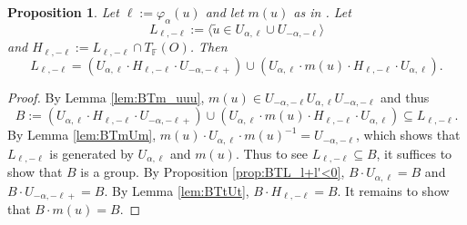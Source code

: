 \documentclass[12pt]{amsart}
\newcommand{\F}{\mathbb{F} }
\numberwithin{equation}{section}
\newtheorem{proposition}[theorem]{Proposition}
\theoremstyle{remark} %
\begin{document}
		\begin{proposition}\label{prop:BTL_l+l'=0} %
			Let 
			$\ell := \varphi_\alpha(u)$ and let $m(u)$ as in \cite[Lemma \ref{I-lem:Jacobson_Morozov_m}]{AppAGRCF}. Let 
			$$
			L_{\ell,- \ell} := \langle \tilde{u} \in U_{\alpha, \ell} \cup U_{-\alpha, -\ell} \rangle 
			$$
			and $H_{\ell, -\ell} := L_{\ell,-\ell} \cap T_\F(O) $. Then
			$$
			L_{\ell,-\ell} = (U_{\alpha,\ell}\cdot H_{\ell, -\ell} \cdot U_{-\alpha,-\ell+}) \cup (U_{\alpha,\ell} \cdot m(u) \cdot H_{\ell,-\ell} \cdot U_{\alpha,\ell}).
			$$
		\end{proposition}
		\begin{proof}
			By Lemma \ref{lem:BTm_uuu}, $m(u) \in U_{-\alpha,-\ell} U_{\alpha, \ell} U_{-\alpha,-\ell}$ and thus
			$$
			B:= (U_{\alpha,\ell}\cdot H_{\ell, -\ell} \cdot U_{-\alpha,-\ell+}) \cup (U_{\alpha,\ell} \cdot m(u) \cdot H_{\ell,-\ell} \cdot U_{\alpha,\ell}) \subseteq L_{\ell,-\ell}.
			$$
			By Lemma \ref{lem:BTmUm}, $m(u) \cdot U_{\alpha, \ell}\cdot m(u)^{-1} = U_{-\alpha, -\ell}$, which shows that $L_{\ell,-\ell}$ is generated by $U_{\alpha,\ell}$ and $m(u)$. Thus to see $L_{\ell,-\ell} \subseteq B$, it suffices to show that $B$ is a group.
			By Proposition \ref{prop:BTL_l+l'<0}, $B\cdot U_{\alpha, \ell} = B$ and $B\cdot U_{-\alpha,-\ell+} = B$. By Lemma \ref{lem:BTtUt}, $B\cdot H_{\ell,-\ell} = B$. It remains to show that $B \cdot m(u) = B$. 
			

\end{proof}
\end{document}
